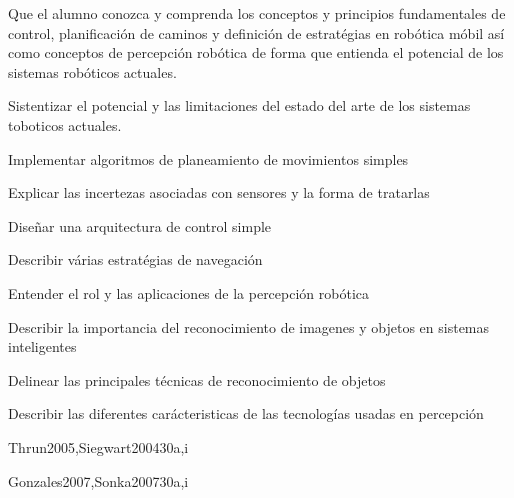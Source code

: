 \begin{syllabus}


\begin{justification}
Que el alumno conozca y comprenda los conceptos y principios fundamentales de control, planificación de caminos 
y definición de estratégias en robótica móbil así como conceptos de percepción robótica de forma que entienda 
el potencial de los sistemas robóticos actuales.
\end{justification}

\begin{goals}
\item Sistentizar el potencial y las limitaciones del estado del arte de los sistemas toboticos actuales.
\item Implementar algoritmos de planeamiento de movimientos simples
\item Explicar las incertezas asociadas con sensores y la forma de tratarlas
\item Diseñar una arquitectura de control simple
\item Describir várias estratégias de navegación
\item Entender el rol y las aplicaciones de la percepción robótica
\item Describir la importancia del reconocimiento de imagenes y objetos en sistemas inteligentes
\item Delinear las principales técnicas de reconocimiento de objetos
\item Describir las diferentes carácteristicas de las tecnologías usadas en percepción
\end{goals}

\begin{outcomes}
\end{outcomes}

\begin{unit}{\ISRoboticsDef}{}{Thrun2005,Siegwart2004}{30}{a,i}
   \ISRoboticsAllTopics
   \ISRoboticsAllObjectives
\end{unit}

\begin{unit}{\ISPerceptionDef}{}{Gonzales2007,Sonka2007}{30}{a,i}
   \ISPerceptionAllTopics
   \ISPerceptionAllObjectives
\end{unit}

\begin{coursebibliography}
\end{coursebibliography}

\end{syllabus}
